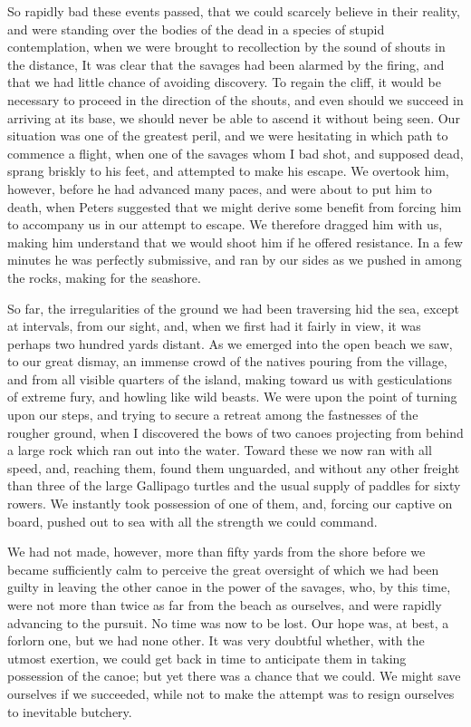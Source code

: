 So rapidly bad these events passed, that we could scarcely believe in their
reality, and were standing over the bodies of the dead in a species of stupid
contemplation, when we were brought to recollection by the sound of shouts in
the distance, It was clear that the savages had been alarmed by the firing, and
that we had little chance of avoiding discovery. To regain the cliff, it would
be necessary to proceed in the direction of the shouts, and even should we
succeed in arriving at its base, we should never be able to ascend it without
being seen. Our situation was one of the greatest peril, and we were hesitating
in which path to commence a flight, when one of the savages whom I bad shot, and
supposed dead, sprang briskly to his feet, and attempted to make his escape. We
overtook him, however, before he had advanced many paces, and were about to put
him to death, when Peters suggested that we might derive some benefit from
forcing him to accompany us in our attempt to escape. We therefore dragged him
with us, making him understand that we would shoot him if he offered resistance.
In a few minutes he was perfectly submissive, and ran by our sides as we pushed
in among the rocks, making for the seashore. 

So far, the irregularities of the ground we had been traversing hid the sea,
except at intervals, from our sight, and, when we first had it fairly in view,
it was perhaps two hundred yards distant. As we emerged into the open beach we
saw, to our great dismay, an immense crowd of the natives pouring from the
village, and from all visible quarters of the island, making toward us with
gesticulations of extreme fury, and howling like wild beasts. We were upon the
point of turning upon our steps, and trying to secure a retreat among the
fastnesses of the rougher ground, when I discovered the bows of two canoes
projecting from behind a large rock which ran out into the water. Toward these
we now ran with all speed, and, reaching them, found them unguarded, and without
any other freight than three of the large Gallipago turtles and the usual supply
of paddles for sixty rowers. We instantly took possession of one of them, and,
forcing our captive on board, pushed out to sea with all the strength we could
command. 

We had not made, however, more than fifty yards from the shore before we
became sufficiently calm to perceive the great oversight of which we had been
guilty in leaving the other canoe in the power of the savages, who, by this
time, were not more than twice as far from the beach as ourselves, and were
rapidly advancing to the pursuit. No time was now to be lost. Our hope was, at
best, a forlorn one, but we had none other. It was very doubtful whether, with
the utmost exertion, we could get back in time to anticipate them in taking
possession of the canoe; but yet there was a chance that we could. We might save
ourselves if we succeeded, while not to make the attempt was to resign ourselves
to inevitable butchery. 

